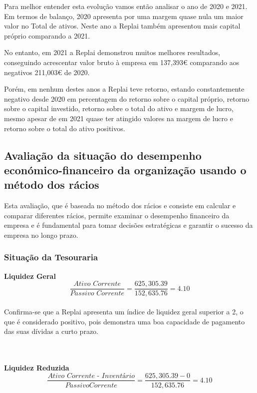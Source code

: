 Para melhor entender esta evolução vamos então analisar o ano de 2020 e 2021.\\

Em termos de balanço, 2020 apresenta por uma margem quase nula um maior valor no Total de ativos. Neste ano a Replai também apresentou mais capital próprio comparando a 2021. 


No entanto, em 2021 a Replai demonstrou muitos melhores resultados, conseguindo acrescentar valor bruto à empresa em 137,393€ comparando aos negativos 211,003€ de 2020. 


Porém, em nenhum destes anos a Replai teve retorno, estando constantemente negativo desde 2020 em percentagem do retorno sobre o capital próprio, retorno sobre o capital investido, retorno sobre o total do ativo e margem de lucro, mesmo apesar de em 2021 quase ter atingido valores na margem de lucro e retorno sobre o total do ativo positivos. 
\newpage
\subsection{Avaliação da situação do desempenho económico-financeiro da organização usando o método dos rácios}

Esta avaliação, que é baseada no método dos rácios e consiste em calcular e comparar diferentes rácios, permite examinar o desempenho financeiro da empresa e é fundamental para tomar decisões estratégicas e garantir o sucesso da empresa no longo prazo.



\subsubsection{Situação da Tesouraria}
\textbf{Liquidez Geral}\\
\[
    \frac{\textit{Ativo Corrente}}{\textit{Passivo Corrente}} = \frac{625,305.39}{152,635.76} = 4.10
\] \\

Confirma-se que a Replai apresenta um índice de liquidez geral superior a 2, o que é considerado positivo, pois demonstra uma boa capacidade de pagamento das suas dívidas a curto prazo.

\hrulefill
\\~\\

\textbf{Liquidez Reduzida}\\
\[
    \frac{\textit{Ativo Corrente - Inventário}}{Passivo Corrente} = \frac{625,305.39 - 0}{152,635.76} = 4.10
\] \\

